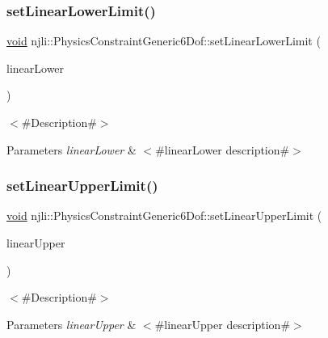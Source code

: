 \subsubsection{\texorpdfstring{set\+Linear\+Lower\+Limit()}{setLinearLowerLimit()}}
{\footnotesize\ttfamily \mbox{\hyperlink{_thread_8h_af1e856da2e658414cb2456cb6f7ebc66}{void}} njli\+::\+Physics\+Constraint\+Generic6\+Dof\+::set\+Linear\+Lower\+Limit (\begin{DoxyParamCaption}\item[{const bt\+Vector3 \&}]{linear\+Lower }\end{DoxyParamCaption})}

$<$\#\+Description\#$>$


\begin{DoxyParams}{Parameters}
{\em linear\+Lower} & $<$\#linear\+Lower description\#$>$ \\
\hline
\end{DoxyParams}
\mbox{\label{classnjli_1_1_physics_constraint_generic6_dof_a36ecbb880f9b8d1e47295a8cb4d38ac2}} 
\subsubsection{\texorpdfstring{set\+Linear\+Upper\+Limit()}{setLinearUpperLimit()}}
{\footnotesize\ttfamily \mbox{\hyperlink{_thread_8h_af1e856da2e658414cb2456cb6f7ebc66}{void}} njli\+::\+Physics\+Constraint\+Generic6\+Dof\+::set\+Linear\+Upper\+Limit (\begin{DoxyParamCaption}\item[{const bt\+Vector3 \&}]{linear\+Upper }\end{DoxyParamCaption})}

$<$\#\+Description\#$>$


\begin{DoxyParams}{Parameters}
{\em linear\+Upper} & $<$\#linear\+Upper description\#$>$ \\
\hline
\end{DoxyParams}
\mbox{\label{classnjli_1_1_physics_constraint_generic6_dof_a906e4dd9d37dfce908cbae90e58f3dbf}} 
